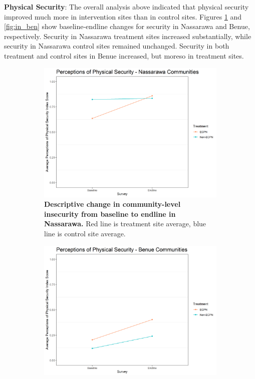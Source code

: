 \documentclass[11pt]{article}
\begin{document}
\textbf{Physical Security}: The overall analysis above indicated that
physical security improved much more in intervention sites than in
control sites. Figures \ref{fig:in_nas} and \ref{fig:in_ben} show
baseline-endline changes for security in Nassarawa and Benue,
respectively. Security in Nassarawa treatment sites increased
substantially, while security in Nassarawa control sites remained
unchanged. Security in both treatment and control sites in Benue
increased, but moreso in treatment sites.

\begin{figure}[H]
    \begin{subfigure}[b]{.48\textwidth}
    \centering
        \includegraphics[width=\linewidth]{../../../figs/inComm_plot_nas.png}
        \caption{\textbf{Descriptive change in community-level insecurity from baseline to endline in Nassarawa.} Red line is treatment site average, blue line is control site average.}
        \label{fig:in_nas}
    \end{subfigure}
    \hfill
    \begin{subfigure}[b]{.48\textwidth}
    \centering
        \includegraphics[width=\linewidth]{../../../figs/inComm_plot_ben.png}

\end{subfigure}
\end{figure}
\end{document}
